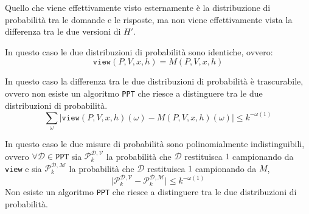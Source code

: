 Quello che viene effettivamente visto esternamente è la distribuzione di probabilità tra le domande e le risposte, ma 
non viene effettivamente vista la differenza tra le due versioni di $H'$.
\begin{tcolorbox}[title = Perfect Zero Knowledge]
    In questo caso le due distribuzioni di probabilità sono identiche, ovvero:
    \[
      \texttt{view}(P,V,x,h) = M(P,V,x,h)
    \]
\end{tcolorbox}
\begin{tcolorbox}[title = Statistical Zero Knowledge]
    In questo caso la differenza tra le due distribuzioni di probabilità è trascurabile, ovvero
    non esiste un algoritmo \texttt{PPT} che riesce a distinguere tra le due distribuzioni di probabilità.
    \[
      \sum_\omega \bigg| \texttt{view}(P,V,x,h)(\omega) - M(P,V,x,h)(\omega)  \bigg| \leq k^{-\omega(1)}
    \]
\end{tcolorbox}
\begin{tcolorbox}[title = Computational Zero Knowledge]
    In questo caso le due misure di probabilità sono polinomialmente indistinguibili, ovvero
    $\forall \mathcal{D} \in \texttt{PPT}$ sia $\mathcal{P}_k^{\mathcal{D}, \mathcal{V}}$ la
    probabilità che $\mathcal{D}$ restituisca $1$ campionando da \texttt{view} e 
    sia $\mathcal{P}_k^{\mathcal{D}, \mathcal{M}}$ la probabilità che $\mathcal{D}$
    restituisca $1$ campionando da $M$,
    \[
        \bigg| \mathcal{P}_k^{\mathcal{D}, \mathcal{V}} - \mathcal{P}_k^{\mathcal{D}, \mathcal{M}} \bigg| \leq k^{-\omega(1)}
    \]
    Non esiste un algoritmo \texttt{PPT} che riesce a distinguere tra le due distribuzioni di probabilità.
\end{tcolorbox}

